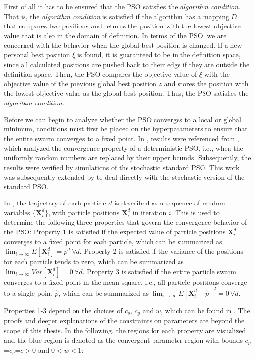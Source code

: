\documentclass[
  oneside, a4paper, 12pt, openany]{book}
\theoremstyle{definition}
\theoremstyle{definition}
\theoremstyle{definition}
\theoremstyle{definition}
\theoremstyle{remark}
\begin{document}
First of all it has to be ensured that the PSO satisfies the \emph{algorithm condition}. That is, the \emph{algorithm condition} is satisfied if the algorithm has a mapping \(D\) that compares two positions and returns the position with the lowest objective value that is also in the domain of definition. In terms of the PSO, we are concerned with the behavior when the global best position is changed. If a new personal best position \(\xi\) is found, it is guaranteed to be in the definition space, since all calculated positions are pushed back to their edge if they are outside the definition space. Then, the PSO compares the objective value of \(\xi\) with the objective value of the previous global best position \(z\) and stores the position with the lowest objective value as the global best position. Thus, the PSO satisfies the \emph{algorithm condition}.

Before we can begin to analyze whether the PSO converges to a local or global minimum, conditions must first be placed on the hyperparameters to ensure that the entire swarm converges to a fixed point. In \citep{FbEn2010}, results were referenced from \citep{RiPo2007}, which analyzed the convergence property of a deterministic PSO, i.e., when the uniformly random numbers are replaced by their upper bounds. Subsequently, the results were verified by simulations of the stochastic standard PSO. This work was subsequently extended by \citep{Mjly2006} to deal directly with the stochastic version of the standard PSO.

In \citep{Mjly2006}, the trajectory of each particle \(d\) is described as a sequence of random variables \(\{\pmb{X}^d_i\}\), with particle positions \(\pmb{X}^d_i\) in iteration \(i\). This is used to determine the following three properties that govern the convergence behavior of the PSO: Property 1 is satisfied if the expected value of particle positions \(\pmb{X}^d_i\) converges to a fixed point for each particle, which can be summarized as \(\lim_{i\rightarrow \infty} E[\pmb{X}^d_i] = p^d \ \forall d\). Property 2 is satisfied if the variance of the positions for each particle tends to zero, which can be summarized as \(\lim_{i\rightarrow \infty} Var[\pmb{X}^d_i] = 0 \ \forall d\). Property 3 is satisfied if the entire particle swarm converges to a fixed point in the mean square, i.e., all particle positions converge to a single point \(\hat{p}\), which can be summarized as \(\lim_{i\rightarrow \infty} E[\pmb{X}_i^d-\hat{p}]^2=0 \ \forall d\).

Properties 1-3 depend on the choices of \(c_p\), \(c_g\) and \(w\), which can be found in \citep{Mjly2006}. The proofs and deeper explanations of the constraints on parameters are beyond the scope of this thesis. In the following, the regions for each property are visualized and the blue region is denoted as the convergent parameter region with bounds \(c_p\)=\(c_g\)=\(c>0\) and \(0<w<1\):
\end{document}

